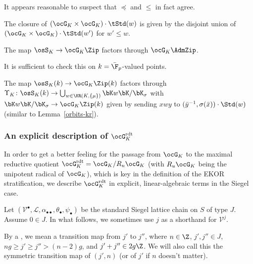 \documentclass[a4paper]{scrartcl} %
\numberwithin{equation}{section}
\begin{document}
It appears reasonable to suspect that $\preceq$ and $\leq$ in fact agree.

\begin{Conjecture}
  The closure of ${(\ocG_K\times\ocG_K)\cdot\tStd(w)}$ is given by the disjoint union of ${(\ocG_K\times\ocG_K)\cdot\tStd(w')}$ for $w'\leq w$.
\end{Conjecture}



\begin{Lemma}\label{factor-thru-admzip}
  The map $\osS_K\to \ocG_K\Zip$ factors through $\ocG_K\AdmZip$.
\end{Lemma}

\begin{Proof}
  It is sufficient to check this on $k=\bar\F_p$-valued points.

  The map $\osS_K(k)\to \ocG_K\Zip(k)$ factors through $\Upsilon_K\colon \osS_K(k) \to \bigcup_{w\in \KR(K,\{\mu\})} \bK w \bK/\bK_\sigma$ with $\bK w \bK/\bK_\sigma\to\ocG_K\Zip(k)$ given by sending $xwy$ to $(\bar{y}^{-1},\sigma(\bar{x}))\cdot\Std(w)$ (similar to Lemma~\ref{orbits-kr}).
\end{Proof}









  
\subsubsection{An explicit description of \texorpdfstring{$\ocG_K^\mathrm{rdt}$}{GK\textasciicircum{}rdt}}
\label{sec:GKrdt-siegel}

In order to get a better feeling for the passage from $\ocG_K$ to the maximal reductive quotient $\ocG_K^\mathrm{rdt}=\ocG_K/R_u\ocG_K$ (with $R_u\ocG_K$ being the unipotent radical of $\ocG_K$), which is key in the definition of the EKOR stratification, we describe $\ocG_K^\mathrm{rdt}$ in explicit, linear-algebraic terms in the Siegel case.

Let $(\mathcal{V}^\bullet,\mathcal{L},\alpha_{\bullet\bullet},\theta_\bullet,\psi_\bullet)$ be the standard Siegel lattice chain on $S$ of type $J$. Assume $0\in J$. In what follows, we sometimes use $j$ as a shorthand for $\mathcal{V}^j$.

By a , we mean a transition map from $j'$ to $j''$, where $n\in\Z$, $j',j''\in J$, $ng\geq j'\geq j''> (n-2)g$, and $j' + j''\in 2g\Z$. We will also call this the symmetric transition map of $(j',n)$ (or of $j'$ if $n$ doesn't matter).
  
\end{document}
